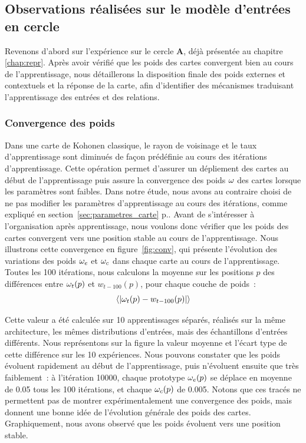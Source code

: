 \documentclass[../main]{subfiles}
\begin{document}
\subsection{Observations réalisées sur le modèle d'entrées en cercle}

Revenons d'abord sur l'expérience sur le cercle \textbf{A}, déjà présentée au chapitre \ref{chap:repr}. 
Après avoir vérifié que les poids des cartes convergent bien au cours de l'apprentissage, nous détaillerons la disposition finale des poids externes et contextuels et la réponse de la carte, afin d'identifier des mécanismes traduisant l'apprentissage des entrées et des relations.

\subsubsection{Convergence des poids}

Dans une carte de Kohonen classique, le rayon de voisinage et le taux d'apprentissage sont diminués de façon prédéfinie au cours des itérations d'apprentissage.
Cette opération permet d'assurer un dépliement des cartes au début de l'apprentissage puis assure la convergence des poids $\omega$ des cartes lorsque les paramètres sont faibles.
Dans notre étude, nous avons au contraire choisi de ne pas modifier les paramètres d'apprentissage au cours des itérations, comme expliqué en section~\ref{sec:parametres_carte} p.\pageref{sec:parametres_carte}.
Avant de s'intéresser à l'organisation après apprentissage, nous voulons donc vérifier que les poids des cartes convergent vers une position stable au cours de l'apprentissage.
Nous illustrons cette convergence en figure~\ref{fig:conv}, qui présente l'évolution des variations des poids $\omega_{e}$ et $\omega_{c}$ dans chaque carte au cours de l'apprentissage. 
Toutes les 100 itérations, nous calculons la moyenne sur les positions $p$ des différences entre $\omega_t(p)$ et $w_{t-100}(p)$, pour chaque couche de poids~:
$$ \langle | \omega_t(p) - w_{t-100}(p)| \rangle $$

Cette valeur a été calculée sur 10 apprentissages séparés, réalisés sur la même architecture, les mêmes distributions d'entrées, mais des échantillons d'entrées différents. Nous représentons sur la figure la valeur moyenne et l'écart type de cette différence sur les 10 expériences.
Nous pouvons constater que les poids évoluent rapidement au début de l'apprentissage, puis n'évoluent ensuite que très faiblement~: à l'itération 10000, chaque prototype $\omega_e(p)$ se déplace en moyenne de 0.05 tous les 100 itérations, et chaque $\omega_c(p)$ de 0.005.
Notons que ces tracés ne permettent pas de montrer expérimentalement une convergence des poids, mais donnent une bonne idée de l'évolution générale des poids des cartes. 
Graphiquement, nous avons observé que les poids évoluent vers une position stable.
\end{document}

